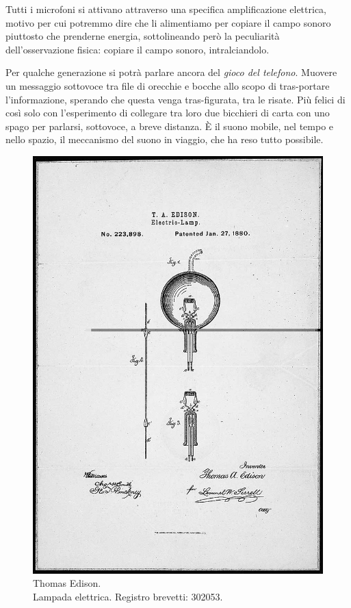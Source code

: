 \begin{refsection}
Tutti i microfoni si attivano attraverso una specifica amplificazione elettrica,
motivo per cui potremmo dire che li alimentiamo per copiare il campo sonoro
piuttosto che prenderne energia, sottolineando però la peculiarità dell'osservazione
fisica: copiare il campo sonoro, intralciandolo.

Per qualche generazione si potrà parlare ancora del \emph{gioco del telefono}. Muovere
un messaggio sottovoce tra file di orecchie e bocche allo scopo di tras-portare
l'informazione, sperando che questa venga tras-figurata, tra le risate. Più
felici di così solo con l'esperimento di collegare tra loro due bicchieri di carta con
uno spago per parlarsi, sottovoce, a breve distanza. È il suono mobile, nel tempo
e nello spazio, il meccanismo del suono in viaggio, che ha reso tutto possibile.

\begin{figure}[t!]
\centering
\includegraphics[width=0.99\columnwidth]{CAPITOLI/0200/img/light-patent-drawing-l.png}
\caption[]{Thomas Edison. \\ Lampada elettrica. Registro brevetti: 302053.}
\label{te:lamp}
\end{figure}


\end{refsection}
